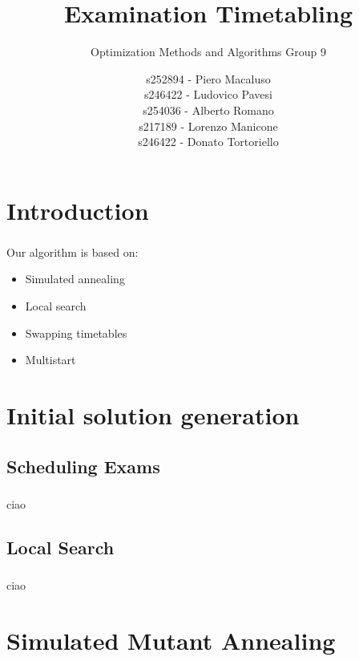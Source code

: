 \documentclass{beamer}
\title{Examination Timetabling} %
\subtitle{Optimization Methods and Algorithms Group 9} %
\author{s252894 - Piero Macaluso\\s246422 - Ludovico Pavesi\\s254036 - Alberto Romano\\s217189 - Lorenzo Manicone\\s246422 - Donato Tortoriello}
\begin{document}
  \frame{\maketitle}

	
	\section{Introduction}
	\begin{frame}
	\frametitle{\insertsection}
	Our algorithm is based on:
	\begin{itemize}
		\item Simulated annealing
		\item Local search
		\item Swapping timetables
		\item Multistart
	\end{itemize}
	\end{frame}
	
   \section{Initial solution generation}
   
   \subsection{Scheduling Exams}

	\begin{frame}
	   \frametitle{\insertsubsection}
	ciao
	\end{frame}

   \subsection{Local Search}

	\begin{frame}
	   \frametitle{\insertsubsection}
	ciao
	\end{frame}

\section{Simulated Mutant Annealing}
\end{document}
